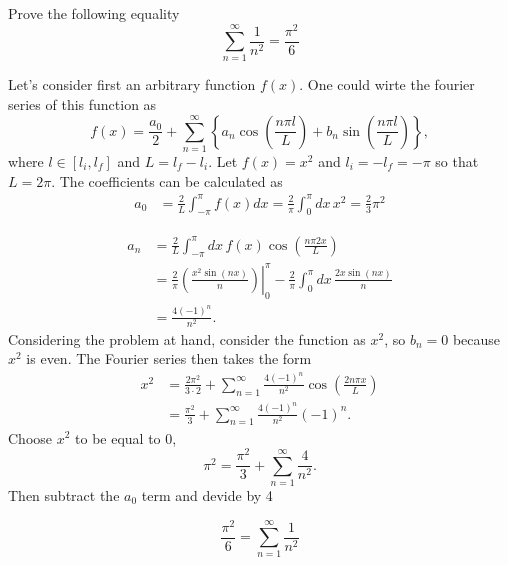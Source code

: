 Prove the following equality
\begin{equation}
\sum_{n = 1}^\infty \frac{1}{n^2} = \frac{\pi^2}{6}
\end{equation}

\begin{problem}

Let's consider first an arbitrary function $f(x)$. One could wirte the fourier series of this function as
\begin{equation}
f(x) = \frac{a_0}{2} + \sum_{n=1}^\infty \left\lbrace a_n \cos\left( \frac{n \pi l}{L}  \right) + b_n \sin \left(  \frac{n \pi l}{L} \right)  \right\rbrace,
\end{equation}
where $l\in [l_i,l_f]$ and $L = l_f - l_i$. Let $f(x) = x^2$ and $l_i = -l_f = -\pi$ so that $L = 2\pi$. The coefficients can be calculated as
\begin{align}
a_0 &= \frac{2}{L} \int_{-\pi}^\pi f(x) dx = \frac{2}{\pi} \int_0^\pi dx\, x^2 = \frac{2}{3}\pi^2
\end{align}

\begin{align}
	a_n &= \frac{2}{L} \int_{-\pi}^\pi dx\, f(x) \cos\left(\frac{n \pi 2 x}{L} \right) \\ \nonumber
		&= \frac{2}{\pi }\left.\left(  \frac{x^2 \sin(nx)}{n} \right)\right|_0^\pi - \frac{2}{\pi} \int_0^\pi dx\, \frac{2x 		\sin(nx)}{n}\\ \nonumber
		&= \frac{4 (-1)^n}{n^2}.
\end{align}
Considering the problem at hand, consider the function as $x^2$, so $b_n = 0$ because $x^2$ is even. The Fourier series then takes the form
\begin{align}
x^2 &= \frac{2\pi^2}{3\cdot 2} + \sum_{n=1}^\infty \frac{4 (-1)^n}{n^2} \cos\left( \frac{2n\pi x}{L}  \right) \\
&= \frac{\pi^2}{3} + \sum_{n=1}^\infty \frac{4 (-1)^n}{n^2} (-1)^n. \nonumber
\end{align} Choose $x^2$ to be equal to 0,
\begin{equation}
\pi^2 = \frac{\pi^2}{3} + \sum_{n=1}^\infty \frac{4}{n^2}.
\end{equation} Then subtract the $a_0$ term and devide by 4

\begin{equation}
\frac{\pi^2}{6} = \sum_{n=1}^\infty \frac{1}{n^2}
\end{equation}
\end{problem}


